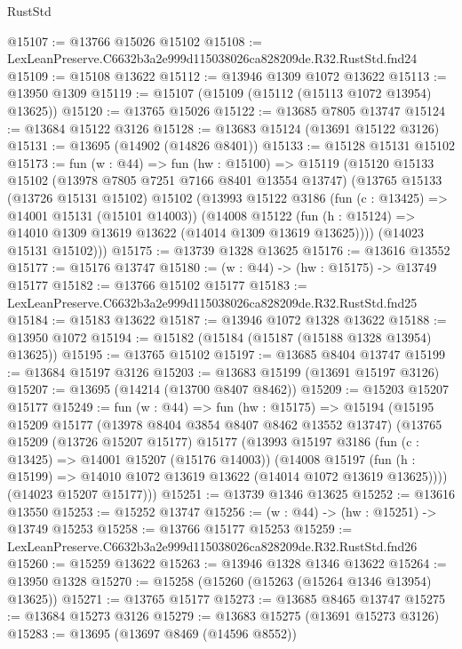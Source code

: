 \begin{lexlean}{RustStd}
\begin{coremodule}
@15107 := @13766 @15026 @15102
@15108 := LexLeanPreserve.C6632b3a2e999d115038026ca828209de.R32.RustStd.fnd24
@15109 := @15108 @13622
@15112 := @13946 @1309 @1072 @13622
@15113 := @13950 @1309
@15119 := @15107 (@15109 (@15112 (@15113 @1072 @13954) @13625))
@15120 := @13765 @15026
@15122 := @13685 @7805 @13747
@15124 := @13684 @15122 @3126
@15128 := @13683 @15124 (@13691 @15122 @3126)
@15131 := @13695 (@14902 (@14826 @8401))
@15133 := @15128 @15131 @15102
@15173 := fun (w : @44) =>
  fun (hw : @15100) =>
  @15119
    (@15120
      @15133
      @15102
      (@13978 @7805 @7251 @7166 @8401 @13554 @13747)
      (@13765
        @15133
        (@13726 @15131 @15102)
        @15102
        (@13993
          @15122
          @3186
          (fun (c : @13425) => @14001 @15131 (@15101 @14003))
          (@14008
            @15122
            (fun (h : @15124) => @14010 @1309 @13619 @13622 (@14014 @1309 @13619 @13625))))
        (@14023 @15131 @15102)))
@15175 := @13739 @1328 @13625
@15176 := @13616 @13552
@15177 := @15176 @13747
@15180 := (w : @44) -> (hw : @15175) -> @13749 @15177
@15182 := @13766 @15102 @15177
@15183 := LexLeanPreserve.C6632b3a2e999d115038026ca828209de.R32.RustStd.fnd25
@15184 := @15183 @13622
@15187 := @13946 @1072 @1328 @13622
@15188 := @13950 @1072
@15194 := @15182 (@15184 (@15187 (@15188 @1328 @13954) @13625))
@15195 := @13765 @15102
@15197 := @13685 @8404 @13747
@15199 := @13684 @15197 @3126
@15203 := @13683 @15199 (@13691 @15197 @3126)
@15207 := @13695 (@14214 (@13700 @8407 @8462))
@15209 := @15203 @15207 @15177
@15249 := fun (w : @44) =>
  fun (hw : @15175) =>
  @15194
    (@15195
      @15209
      @15177
      (@13978 @8404 @3854 @8407 @8462 @13552 @13747)
      (@13765
        @15209
        (@13726 @15207 @15177)
        @15177
        (@13993
          @15197
          @3186
          (fun (c : @13425) => @14001 @15207 (@15176 @14003))
          (@14008
            @15197
            (fun (h : @15199) => @14010 @1072 @13619 @13622 (@14014 @1072 @13619 @13625))))
        (@14023 @15207 @15177)))
@15251 := @13739 @1346 @13625
@15252 := @13616 @13550
@15253 := @15252 @13747
@15256 := (w : @44) -> (hw : @15251) -> @13749 @15253
@15258 := @13766 @15177 @15253
@15259 := LexLeanPreserve.C6632b3a2e999d115038026ca828209de.R32.RustStd.fnd26
@15260 := @15259 @13622
@15263 := @13946 @1328 @1346 @13622
@15264 := @13950 @1328
@15270 := @15258 (@15260 (@15263 (@15264 @1346 @13954) @13625))
@15271 := @13765 @15177
@15273 := @13685 @8465 @13747
@15275 := @13684 @15273 @3126
@15279 := @13683 @15275 (@13691 @15273 @3126)
@15283 := @13695 (@13697 @8469 (@14596 @8552))

\end{coremodule}
\end{lexlean}
